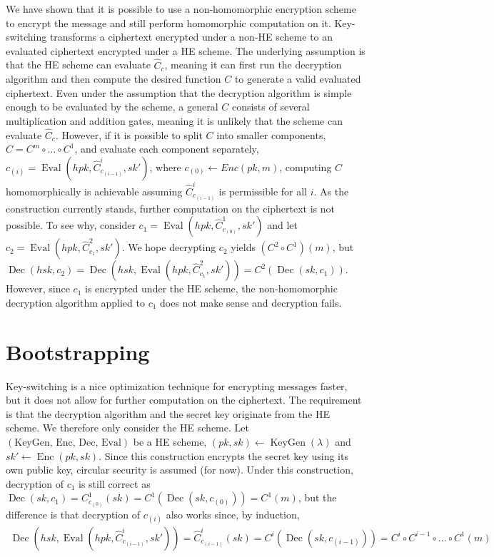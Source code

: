We have shown that it is possible to use a non-homomorphic encryption scheme to encrypt the message and still perform homomorphic computation on it. Key-switching transforms a ciphertext encrypted under a non-HE scheme to an evaluated ciphertext encrypted under a HE scheme. The underlying assumption is that the HE scheme can evaluate $\hat{C}_c$, meaning it can first run the decryption algorithm and then compute the desired function $C$ to generate a valid evaluated ciphertext. Even under the assumption that the decryption algorithm is simple enough to be evaluated by the scheme, a general $C$ consists of several multiplication and addition gates, meaning it is unlikely that the scheme can evaluate $\hat{C}_c$. However, if it is possible to split $C$ into smaller components, $C = C^m \circ \dots \circ C^1$, and evaluate each component separately, $c_{(i)} = \operatorname{Eval}(hpk,\hat{C}^i_{c_{(i-1)}}, sk')$, where $c_{(0)} \leftarrow Enc(pk,m)$, computing $C$ homomorphically is achievable assuming $\hat{C}^i_{c_{(i-1)}}$ is permissible for all $i$. As the construction currently stands, further computation on the ciphertext is not possible. To see why, consider $c_1 = \operatorname{Eval}(hpk,\hat{C}^1_{c_{(0)}}, sk')$ and let $c_2 = \operatorname{Eval}(hpk,\hat{C}^2_{c_1}, sk')$. We hope decrypting $c_2$ yields $(C^2 \circ C^1)(m)$, but $\operatorname{Dec}(hsk,c_2) = \operatorname{Dec}(hsk,\operatorname{Eval}(hpk,\hat{C}^2_{c_1}, sk')) = C^2(\operatorname{Dec}(sk, c_1))$. However, since $c_1$ is encrypted under the HE scheme, the non-homomorphic decryption algorithm applied to $c_1$ does not make sense and decryption fails.

\section{Bootstrapping}
Key-switching is a nice optimization technique for encrypting messages faster, but it does not allow for further computation on the ciphertext. The requirement is that the decryption algorithm and the secret key originate from the HE scheme. We therefore only consider the HE scheme. Let $(\text{KeyGen, Enc, Dec, Eval})$ be a HE scheme, $(pk, sk) \leftarrow \operatorname{KeyGen}(\lambda)$ and $sk' \leftarrow \operatorname{Enc}(pk, sk)$. Since this construction encrypts the secret key using its own public key, circular security is assumed (for now). Under this construction, decryption of $c_1$ is still correct as $\operatorname{Dec}(sk, c_1) = C^1_{c_{(0)}}(sk) = C^1(\operatorname{Dec}(sk,c_{(0)})) = C^1(m)$, but the difference is that decryption of $c_{(i)}$ also works since, by induction,
\begin{equation*}
    \begin{aligned}
        \operatorname{Dec}(hsk,\operatorname{Eval}(hpk,\hat{C}^i_{c_{(i-1)}}, sk')) = \hat{C}^i_{c_{(i-1)}}(sk) = C^i(\operatorname{Dec}(sk, c_{(i-1)})) = C^i \circ C^{i-1} \circ  \dots \circ C^1(m)
    \end{aligned}
\end{equation*}

